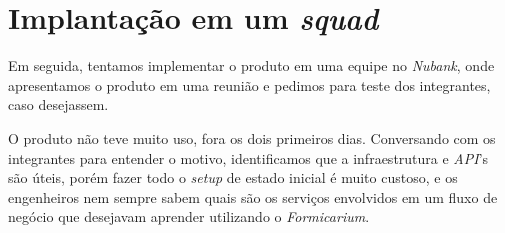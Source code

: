     \section{Implantação em um \textit{squad}}
        Em seguida, tentamos implementar o produto em uma equipe no \textit{Nubank}, onde apresentamos o produto em uma reunião e pedimos para teste dos integrantes, caso desejassem. 
        
        O produto não teve muito uso, fora os dois primeiros dias. Conversando com os integrantes para entender o motivo, identificamos que a infraestrutura e \textit{API}'s são úteis, porém fazer todo o \textit{setup} de estado inicial é muito custoso, e os engenheiros nem sempre sabem quais são os serviços envolvidos em um fluxo de negócio que desejavam aprender utilizando o \textit{Formicarium}.